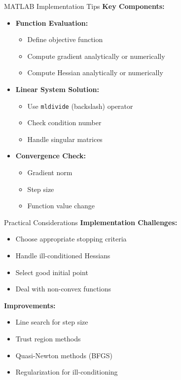 \documentclass[10pt]{beamer}
\theoremstyle{plain}%
\theoremstyle{definition}
\theoremstyle{remark}
\begin{document}
\begin{frame}{MATLAB Implementation Tips}
    \textbf{Key Components:}
    \begin{itemize}
        \item \textbf{Function Evaluation:}
        \begin{itemize}
            \item Define objective function
            \item Compute gradient analytically or numerically
            \item Compute Hessian analytically or numerically
        \end{itemize}
        \item \textbf{Linear System Solution:}
        \begin{itemize}
            \item Use \texttt{mldivide} (backslash) operator
            \item Check condition number
            \item Handle singular matrices
        \end{itemize}
        \item \textbf{Convergence Check:}
        \begin{itemize}
            \item Gradient norm
            \item Step size
            \item Function value change
        \end{itemize}
    \end{itemize}
\end{frame}

\begin{frame}{Practical Considerations}
    \textbf{Implementation Challenges:}
    \begin{itemize}
        \item Choose appropriate stopping criteria
        \item Handle ill-conditioned Hessians
        \item Select good initial point
        \item Deal with non-convex functions
    \end{itemize}
    
    \textbf{Improvements:}
    \begin{itemize}
        \item Line search for step size
        \item Trust region methods
        \item Quasi-Newton methods (BFGS)
        \item Regularization for ill-conditioning
    \end{itemize}
\end{frame}
\end{document}
